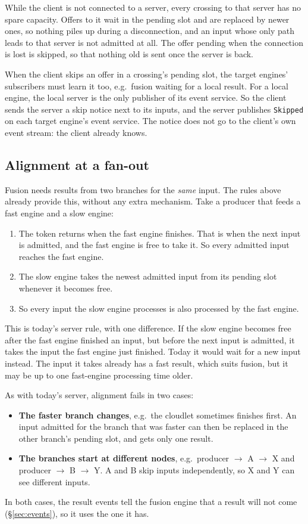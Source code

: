 \documentclass[11pt]{article}
\newcommand{\code}[1]{\texttt{#1}}
\begin{document}
While the client is not connected to a server, every crossing to that server
has no spare capacity. Offers to it wait in the pending slot and are replaced
by newer ones, so nothing piles up during a disconnection, and an input whose
only path leads to that server is not admitted at all. The offer pending when
the connection is lost is skipped, so that nothing old is sent once the
server is back.

When the client skips an offer in a crossing's pending slot, the target
engines' subscribers must learn it too, e.g.\ fusion waiting for a local
result. For a local engine, the local server is the only publisher of its
event service. So the client sends the server a skip notice next to its
inputs, and the server publishes \code{Skipped} on each target engine's event
service. The notice does not go to the client's own event stream: the client
already knows.

\subsection{Alignment at a fan-out}
\label{sec:aligned}

Fusion needs results from two branches for the \emph{same} input. The rules
above already provide this, without any extra mechanism. Take a producer that
feeds a fast engine and a slow engine:
\begin{enumerate}[nosep]
  \item The token returns when the fast engine finishes. That is when the
        next input is admitted, and the fast engine is free to take it. So
        every admitted input reaches the fast engine.
  \item The slow engine takes the newest admitted input from its pending slot
        whenever it becomes free.
  \item So every input the slow engine processes is also processed by the
        fast engine.
\end{enumerate}
This is today's server rule, with one difference. If the slow engine becomes
free after the fast engine finished an input, but before the next input is
admitted, it takes the input the fast engine just finished. Today it would
wait for a new input instead. The input it takes already has a fast result,
which suits fusion, but it may be up to one fast-engine processing time older.

As with today's server, alignment fails in two cases:
\begin{itemize}[nosep]
  \item \textbf{The faster branch changes}, e.g.\ the cloudlet sometimes
        finishes first. An input admitted for the branch that was faster can
        then be replaced in the other branch's pending slot, and gets only
        one result.
  \item \textbf{The branches start at different nodes}, e.g.\ producer $\to$
        A $\to$ X and producer $\to$ B $\to$ Y. A and B skip inputs
        independently, so X and Y can see different inputs.
\end{itemize}
In both cases, the result events tell the fusion engine that a result will not
come (\S\ref{sec:events}), so it uses the one it has.
\end{document}

